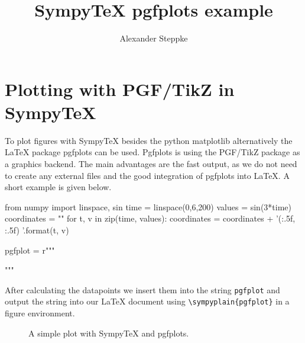\documentclass{article}
\title{SympyTeX pgfplots example}
\author{Alexander Steppke}
\begin{document}
\maketitle

\section{Plotting with PGF/TikZ in SympyTeX}
To plot figures with SympyTeX besides the python matplotlib alternatively the LaTeX package pgfplots can be used. Pgfplots is using the PGF/TikZ package as a graphics backend. The main advantages are the fast output, as we do not need to create any external files and the good integration of pgfplots into LaTeX. A short example is given below.

\begin{sympyblock}
from numpy import linspace, sin
time = linspace(0,6,200)
values = sin(3*time)
coordinates = ""
for t, v in zip(time, values):
  coordinates = coordinates + '({:.5f}, {:.5f}) '.format(t, v)

pgfplot = r"""
""" %

\end{sympyblock}

After calculating the datapoints we insert them into the string {\verb!pgfplot!} and output the string into our LaTeX document using {\verb!\sympyplain{pgfplot}!} in a figure environment.
\begin{figure}
  \centering
  \caption{A simple plot with SympyTeX and pgfplots.}
\end{figure}
\end{document}
